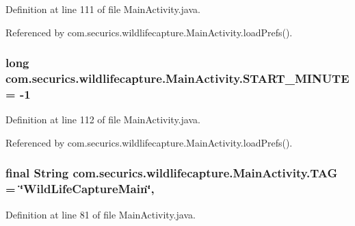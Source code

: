 Definition at line 111 of file Main\+Activity.\+java.



Referenced by com.\+securics.\+wildlifecapture.\+Main\+Activity.\+load\+Prefs().

\subsubsection[{S\+T\+A\+R\+T\+\_\+\+M\+I\+N\+U\+T\+E}]{\setlength{\rightskip}{0pt plus 5cm}long com.\+securics.\+wildlifecapture.\+Main\+Activity.\+S\+T\+A\+R\+T\+\_\+\+M\+I\+N\+U\+T\+E = -\/1\hspace{0.3cm}{\ttfamily [private]}}\label{classcom_1_1securics_1_1wildlifecapture_1_1_main_activity_a590a67f61ae32c48a1054d1219631d1a}


Definition at line 112 of file Main\+Activity.\+java.



Referenced by com.\+securics.\+wildlifecapture.\+Main\+Activity.\+load\+Prefs().

\subsubsection[{T\+A\+G}]{\setlength{\rightskip}{0pt plus 5cm}final String com.\+securics.\+wildlifecapture.\+Main\+Activity.\+T\+A\+G = \char`\"{}Wild\+Life\+Capture\+Main\char`\"{}\hspace{0.3cm}{\ttfamily [static]}, {\ttfamily [private]}}\label{classcom_1_1securics_1_1wildlifecapture_1_1_main_activity_aad8964113ec84171490ba418167d96d8}


Definition at line 81 of file Main\+Activity.\+java.



